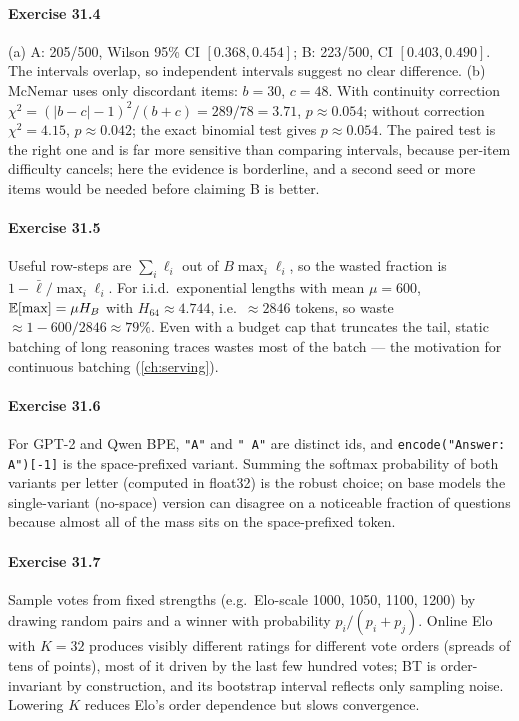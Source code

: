 \paragraph{Exercise 31.4} (a) A: 205/500, Wilson 95\% CI $[0.368, 0.454]$; B: 223/500, CI
$[0.403, 0.490]$. The intervals overlap, so independent intervals suggest no clear difference.
(b) McNemar uses only discordant items: $b = 30$, $c = 48$. With continuity correction
$\chi^2 = (|b-c|-1)^2/(b+c) = 289/78 = 3.71$, $p \approx 0.054$; without correction $\chi^2 = 4.15$,
$p \approx 0.042$; the exact binomial test gives $p \approx 0.054$. The paired test is the right one
and is far more sensitive than comparing intervals, because per-item difficulty cancels; here the
evidence is borderline, and a second seed or more items would be needed before claiming B is better.

\paragraph{Exercise 31.5} Useful row-steps are $\sum_i \ell_i$ out of $B \max_i \ell_i$, so the
wasted fraction is $1 - \bar\ell / \max_i \ell_i$. For i.i.d.\ exponential lengths with mean
$\mu = 600$, $\mathbb{E}[\max] = \mu H_B$ with $H_{64} \approx 4.744$, i.e.\ $\approx 2846$ tokens, so
waste $\approx 1 - 600/2846 \approx 79\%$. Even with a budget cap that truncates the tail, static
batching of long reasoning traces wastes most of the batch --- the motivation for continuous
batching (\cref{ch:serving}).

\paragraph{Exercise 31.6} For GPT-2 and Qwen BPE, \texttt{"A"} and \texttt{" A"} are distinct ids,
and \texttt{encode("Answer: A")[-1]} is the space-prefixed variant. Summing the softmax probability of
both variants per letter (computed in float32) is the robust choice; on base models the
single-variant (no-space) version can disagree on a noticeable fraction of questions because almost
all of the mass sits on the space-prefixed token.

\paragraph{Exercise 31.7} Sample votes from fixed strengths (e.g.\ Elo-scale 1000, 1050, 1100, 1200)
by drawing random pairs and a winner with probability $p_i/(p_i+p_j)$. Online Elo with $K = 32$
produces visibly different ratings for different vote orders (spreads of tens of points), most of it
driven by the last few hundred votes; BT is order-invariant by construction, and its bootstrap
interval reflects only sampling noise. Lowering $K$ reduces Elo's order dependence but slows
convergence.

